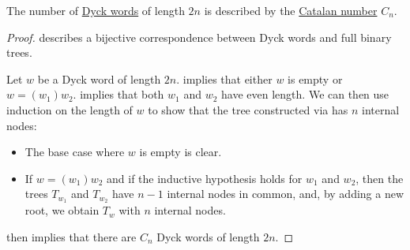 \begin{corollary}\label{thm:dyck_word_count}
  The number of \hyperref[def:dyck_language]{Dyck words} of length \( 2n \) is described by the \hyperref[def:catalan_number]{Catalan number} \( C_n \).
\end{corollary}
\begin{proof}
   describes a bijective correspondence between Dyck words and full binary trees.

  Let \( w \) be a Dyck word of length \( 2n \).  implies that either \( w \) is empty or \( w = (w_1) w_2 \).  implies that both \( w_1 \) and \( w_2 \) have even length. We can then use induction on the length of \( w \) to show that the tree constructed via  has \( n \) internal nodes:
  \begin{itemize}
    \item The base case where \( w \) is empty is clear.
    \item If \( w = (w_1) w_2 \) and if the inductive hypothesis holds for \( w_1 \) and \( w_2 \), then the trees \( T_{w_1} \) and \( T_{w_2} \) have \( n - 1 \) internal nodes in common, and, by adding a new root, we obtain \( T_w \) with \( n \) internal nodes.
  \end{itemize}

   then implies that there are \( C_n \) Dyck words of length \( 2n \).
\end{proof}
